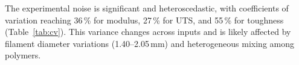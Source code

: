 \documentclass[10pt]{article}
\begin{document}
The experimental noise is significant and heteroscedastic, with coefficients of variation reaching 36\,\% for modulus, 27\,\% for UTS, and 55\,\% for toughness (Table~\ref{tab:cv}). This variance changes across inputs and is likely affected by filament diameter variations (1.40--2.05\,mm) and heterogeneous mixing among polymers.
\end{document}
